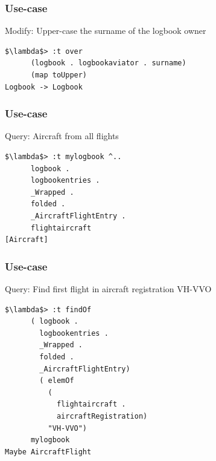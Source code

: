 \begin{frame}[fragile]
\frametitle{Use-case}
\begin{block}{Modify: Upper-case the surname of the logbook owner}
\begin{lstlisting}[style=haskell,basicstyle=\scriptsize\ttfamily,mathescape]
$\lambda$> :t over
      (logbook . logbookaviator . surname)
      (map toUpper)
Logbook -> Logbook
\end{lstlisting}
\end{block}
\end{frame}

\begin{frame}[fragile]
\frametitle{Use-case}
\begin{block}{Query: Aircraft from all flights}
\begin{lstlisting}[style=haskell,basicstyle=\scriptsize\ttfamily,mathescape]
$\lambda$> :t mylogbook ^..
      logbook .
      logbookentries .
      _Wrapped .
      folded .
      _AircraftFlightEntry .
      flightaircraft
[Aircraft]
\end{lstlisting}
\end{block}
\end{frame}

\begin{frame}[fragile]
\frametitle{Use-case}
\begin{block}{Query: Find first flight in aircraft registration VH-VVO}
\begin{lstlisting}[style=haskell,basicstyle=\scriptsize\ttfamily,mathescape]
$\lambda$> :t findOf
      ( logbook . 
        logbookentries . 
        _Wrapped . 
        folded . 
        _AircraftFlightEntry)
        ( elemOf
          (
            flightaircraft . 
            aircraftRegistration)
          "VH-VVO")
      mylogbook
Maybe AircraftFlight
\end{lstlisting}
\end{block}
\end{frame}

